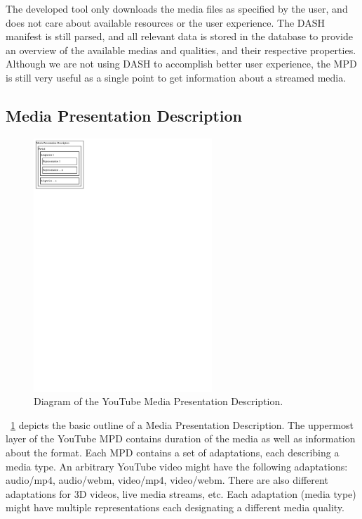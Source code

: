 The developed tool only downloads the media files as specified by the
user, and does not care about available resources or the user experience.
The DASH manifest is still parsed, and all relevant data is stored in the
database to provide an overview of the available medias and qualities,
and their respective properties. Although we are not using DASH to
accomplish better user experience, the MPD is still very useful as a
single point to get information about a streamed media.

\subsection{Media Presentation Description}

\begin{figure}
    \centering
    \includegraphics[width=0.6\textwidth]{figures/dash-mpd-diagram}
    \caption{Diagram of the YouTube Media Presentation Description.}
    \label{fig:dash-mpd-diagram}
\end{figure}

~\cref{fig:dash-mpd-diagram} depicts the basic outline of a Media Presentation
Description. The uppermost layer of the YouTube MPD contains duration of the
media as well as information about the format. Each MPD contains a set of
adaptations, each describing a media type. An arbitrary YouTube video might have
the following adaptations: audio/mp4, audio/webm, video/mp4, video/webm. There
are also different adaptations for 3D videos, live media streams, etc. Each
adaptation (media type) might have multiple representations each designating a
different media quality.

